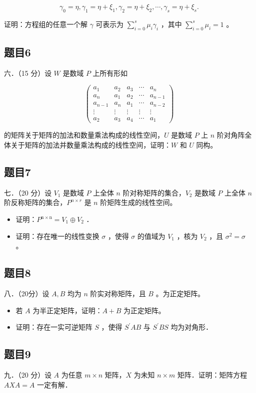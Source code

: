 \documentclass{article}
\begin{document}
\[
\gamma_{0}=\eta, \gamma_{1}=\eta+\xi_{1}, \gamma_{2}=\eta+\xi_{2}, \cdots, \gamma_{s}=\eta+\xi_{s} .
\]

证明：方程组的任意一个解 \(\gamma\) 可表示为 \(\sum_{i=0}^{s} \mu_{i} \gamma_{i}\) ，其中 \(\sum_{i=0}^{s} \mu_{i}=1\) 。

\subsection{题目6}
六．（15 分）设 \(W\) 是数域 \(P\) 上所有形如

\[
\left(\begin{array}{ccccc}
a_{1} & a_{2} & a_{3} & \cdots & a_{n} \\
a_{n} & a_{1} & a_{2} & \cdots & a_{n-1} \\
a_{n-1} & a_{n} & a_{1} & \cdots & a_{n-2} \\
\vdots & \vdots & \vdots & \vdots & \vdots \\
a_{2} & a_{3} & a_{4} & \cdots & a_{1}
\end{array}\right)
\]

的矩阵关于矩阵的加法和数量乘法构成的线性空间，\(U\) 是数域 \(P\) 上 \(n\) 阶对角阵全体关于矩阵的加法并数量乘法构成的线性空间，证明：\(W\) 和 \(U\) 同构。

\subsection{题目7}
七．（20 分）设 \(V_{1}\) 是数域 \(P\) 上全体 \(n\) 阶对称矩阵的集合，\(V_{2}\) 是数域 \(P\) 上全体 \(n\) 阶反称矩阵的集合，\(P^{n \times r}\) 是 \(n\) 阶矩阵生成的线性空间。

\begin{itemize}
  \item[（1）] 证明：\(P^{\mathrm{n} \times \mathrm{n}}=V_{1} \oplus V_{2}\) ．
  \item[（2）] 证明：存在唯一的线性变换 \(\sigma\) ，使得 \(\sigma\) 的值域为 \(V_{1}\) ，核为 \(V_{2}\) ，且 \(\sigma^{2}=\sigma\) 。
\end{itemize}

\subsection{题目8}
八．（20分）设 \(A, B\) 均为 \(n\) 阶实对称矩阵，且 \(B\) 。为正定矩阵。

\begin{itemize}
  \item[（1）] 若 \(A\) 为半正定矩阵，证明：\(A+B\) 为正定矩阵。
  \item[（2）] 证明：存在一实可逆矩阵 \(S\) ，使得 \(S^{\prime} A B\) 与 \(S^{\prime} B S\) 均为对角形．
\end{itemize}

\subsection{题目9}
九．（20 分）设 \(A\) 为任意 \(m \times n\) 矩阵，\(X\) 为未知 \(n \times m\) 矩阵．证明：矩阵方程 \(A X A=A\) 一定有解．
\end{document}
